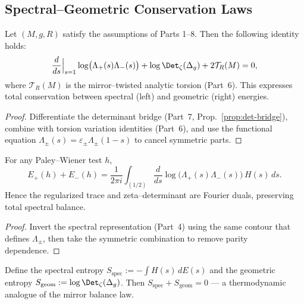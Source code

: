 \subsection{Spectral–Geometric Conservation Laws}
\label{subsec:ch6-part9-laws} \relax \hspace{0pt}
\begin{theorem}
\label{thm:energy-conservation}
Let $(M,g,R)$ satisfy the assumptions of Parts 1–8.  
Then the following identity holds:
\[
\frac{d}{ds}\Big|_{s=1}
\log\!\big(\Lambda_+(s)\Lambda_-(s)\big)
+\log\Det_\zeta(\Delta_g)
+2\mathcal{T}_R(M)
=0,
\]
where $\mathcal{T}_R(M)$ is the mirror–twisted analytic torsion (Part~6).  
This expresses total conservation between spectral (left) and geometric (right) energies.  
\end{theorem}

\begin{proof}
Differentiate the determinant bridge (Part~7, Prop.~\ref{prop:det-bridge}), combine with torsion variation identities (Part~6), and use the functional equation $\Lambda_\pm(s)=\varepsilon_\pm\Lambda_\pm(1-s)$ to cancel symmetric parts.  
\end{proof}

\begin{theorem}
\label{thm:trace-det-eq}
For any Paley–Wiener test $h$,
\[
E_+(h)+E_-(h)
= \frac{1}{2\pi i}\int_{(1/2)}\!
\frac{d}{ds}\log\!\big(\Lambda_+(s)\Lambda_-(s)\big)\,
H(s)\,ds.
\]
Hence the regularized trace and zeta–determinant are Fourier duals, preserving total spectral balance.  
\end{theorem}

\begin{proof}
Invert the spectral representation (Part~4) using the same contour that defines $\Lambda_\pm$, then take the symmetric combination to remove parity dependence.  
\end{proof}

\begin{corollary}
\label{cor:entropy}
Define the spectral entropy $S_{\mathrm{spec}}:=-\int H(s)\,dE(s)$ and the geometric entropy $S_{\mathrm{geom}}:=\log\Det_\zeta(\Delta_g)$.  
Then $S_{\mathrm{spec}}+S_{\mathrm{geom}}=0$ — a thermodynamic analogue of the mirror balance law.  
\end{corollary}

